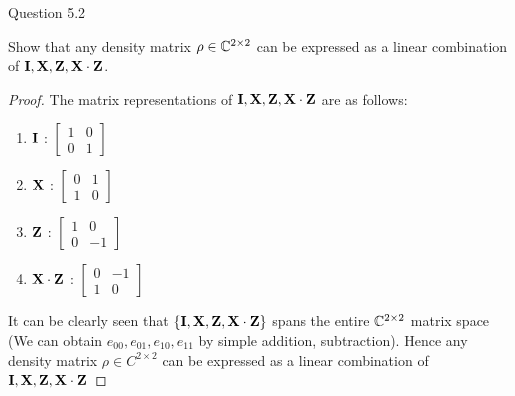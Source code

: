 \begin{solution}{Question 5.2}\label{ques:5.2}
    \begin{question}
    Show that any density matrix $\rho \in \mathbb{C}^{2\times 2}$ can be expressed as a linear combination of $\mathbf{I}, \mathbf{X}, \mathbf{Z}, \mathbf{X} \cdot \mathbf{Z}$.
    \end{question}
    \tcblower{}
    \begin{proof}
    The matrix representations of $\mathbf{I}, \mathbf{X}, \mathbf{Z}, \mathbf{X} \cdot \mathbf{Z}$ are as follows:
    \begin{enumerate}
        \item $\mathbf{I}$ : $\begin{bmatrix}
                        1 & 0 \\
                        0 & 1
                        \end{bmatrix}$
        \item $\mathbf{X}$ : $\begin{bmatrix}
                        0 & 1 \\
                        1 & 0
                        \end{bmatrix}$
        \item $\mathbf{Z}$ : $\begin{bmatrix}
                        1 & 0 \\
                        0 & -1
                        \end{bmatrix}$
        \item $\mathbf{X} \cdot \mathbf{Z}$ : $\begin{bmatrix}
                        0 & -1 \\
                        1 & 0
                        \end{bmatrix}$
    \end{enumerate}

    It can be clearly seen that $\{\mathbf{I}, \mathbf{X}, \mathbf{Z}, \mathbf{X} \cdot \mathbf{Z}\}$ spans the entire $\mathbb{C}^{2\times2}$ matrix space (We can obtain $e_{00},e_{01},e_{10},e_{11}$ by simple addition, subtraction). Hence any density matrix $\rho \in C^{2\times2}$ can be expressed as a linear combination of $\mathbf{I}, \mathbf{X}, \mathbf{Z}, \mathbf{X} \cdot \mathbf{Z}$
    \end{proof}
\end{solution}
